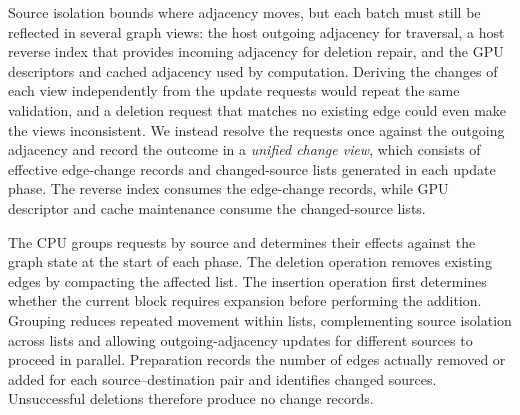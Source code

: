 
Source isolation bounds where adjacency moves, but each batch must still be reflected in several graph views: the host outgoing adjacency for traversal, a host reverse index that provides incoming adjacency for deletion repair, and the GPU descriptors and cached adjacency used by computation. Deriving the changes of each view independently from the update requests would repeat the same validation, and a deletion request that matches no existing edge could even make the views inconsistent. We instead resolve the requests once against the outgoing adjacency and record the outcome in a \textit{unified change view}, which consists of effective edge-change records and changed-source lists generated in each update phase. The reverse index consumes the edge-change records, while GPU descriptor and cache maintenance consume the changed-source lists.

The CPU groups requests by source and determines their effects against the graph state at the start of each phase. The deletion operation removes existing edges by compacting the affected list. The insertion operation first determines whether the current block requires expansion before performing the addition. Grouping reduces repeated movement within lists, complementing source isolation across lists and allowing outgoing-adjacency updates for different sources to proceed in parallel. Preparation records the number of edges actually removed or added for each source--destination pair and identifies changed sources. Unsuccessful deletions therefore produce no change records.

